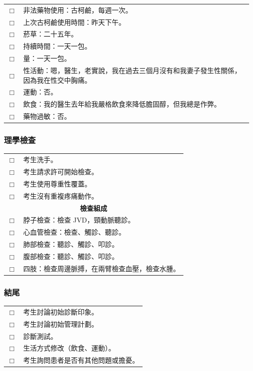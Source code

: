 \documentclass{article}
\newcommand{\checkbox}{\ensuremath{\Box}}
\begin{document}
\begin{longtable}{p{} p{}}
\checkbox & 非法藥物使用：古柯鹼，每週一次。 \\
\checkbox & 上次古柯鹼使用時間：昨天下午。 \\
\checkbox & 菸草：二十五年。 \\
\checkbox & 持續時間：一天一包。 \\
\checkbox & 量：一天一包。 \\
\checkbox & 性活動：嗯，醫生，老實說，我在過去三個月沒有和我妻子發生性關係，因為我在性交中胸痛。 \\
\checkbox & 運動：否。 \\
\checkbox & 飲食：我的醫生去年給我嚴格飲食來降低膽固醇，但我總是作弊。 \\
\checkbox & 藥物過敏：否。 \\
\bottomrule
\end{longtable}

\subsubsection{理學檢查}
\begin{longtable}{p{} p{}}
\toprule
\checkbox & 考生洗手。 \\
\checkbox & 考生請求許可開始檢查。 \\
\checkbox & 考生使用尊重性覆蓋。 \\
\checkbox & 考生沒有重複疼痛動作。 \\
\midrule
\multicolumn{2}{c}{\textbf{檢查組成}} \\
\midrule
\checkbox & 脖子檢查：檢查 JVD，頸動脈聽診。 \\
\checkbox & 心血管檢查：檢查、觸診、聽診。 \\
\checkbox & 肺部檢查：聽診、觸診、叩診。 \\
\checkbox & 腹部檢查：聽診、觸診、叩診。 \\
\checkbox & 四肢：檢查周邊脈搏，在兩臂檢查血壓，檢查水腫。 \\
\bottomrule
\end{longtable}

\subsubsection{結尾}
\begin{longtable}{p{} p{}}
\toprule
\checkbox & 考生討論初始診斷印象。 \\
\checkbox & 考生討論初始管理計劃。 \\
\checkbox & 診斷測試。 \\
\checkbox & 生活方式修改（飲食、運動）。 \\
\checkbox & 考生詢問患者是否有其他問題或擔憂。 \\
\bottomrule
\end{longtable}
\end{document}
